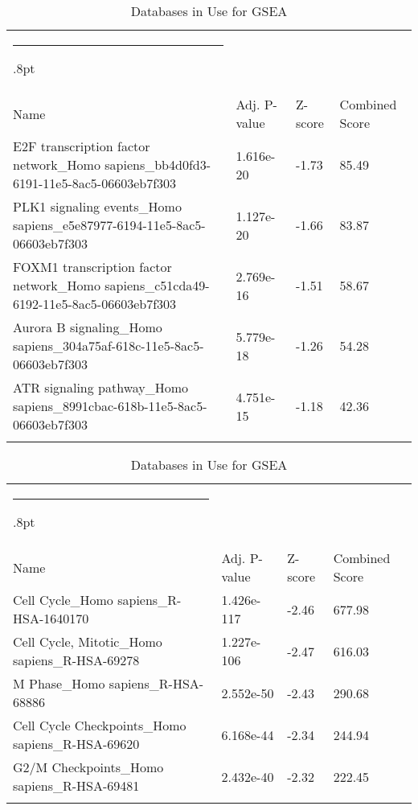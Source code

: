 \documentclass[3p,authoryear,preprint,12pt]{elsarticle}
\makeatletter
\def\hlinewd#1{%
  \noalign{\ifnum0=`}\fi\hrule \@height #1%
  \futurelet\reserved@a\@xhline}
\def\tbltoprule{\hlinewd{.8pt}\\[-12pt]}
\def\tblbottomrule{\noalign{\vspace*{6pt}}\hline\noalign{\vspace*{2pt}}}
\def\tblmidrule{\noalign{\vspace*{6pt}}\hline\noalign{\vspace*{2pt}}}
\makeatother
\begin{document}
\begin{table*}[!htbp]
	\caption{{Databases in Use for GSEA} }
	\label{tw-de478ae31cc6}
	\def\arraystretch{1}
	\ignorespaces 
	\centering 
	\begin{tabulary}{\linewidth}{p{\dimexpr.65\tabcolsep}p{\dimexpr.15\tabcolsep}p{\dimexpr.1\tabcolsep}p{\dimexpr.1\tabcolsep}}
		\tbltoprule Name & Adj. P-value & Z-score & Combined Score\\
		\tblmidrule
E2F transcription factor network\_Homo sapiens\_bb4d0fd3-6191-11e5-8ac5-06603eb7f303 & 1.616e-20 & -1.73 & 85.49 \\
PLK1 signaling events\_Homo sapiens\_e5e87977-6194-11e5-8ac5-06603eb7f303 & 1.127e-20 & -1.66 & 83.87 \\
FOXM1 transcription factor network\_Homo sapiens\_c51cda49-6192-11e5-8ac5-06603eb7f303 & 2.769e-16 & -1.51 & 58.67 \\
Aurora B signaling\_Homo sapiens\_304a75af-618c-11e5-8ac5-06603eb7f303 & 5.779e-18 & -1.26 & 54.28 \\
ATR signaling pathway\_Homo sapiens\_8991cbac-618b-11e5-8ac5-06603eb7f303 & 4.751e-15 & -1.18 & 42.36 \\
		\tblbottomrule
	\end{tabulary}\par 
\end{table*}
\begin{table*}[!htbp]
	\caption{{Databases in Use for GSEA} }
	\label{tw-de478ae31cc6}
	\def\arraystretch{1}
	\ignorespaces 
	\centering 
	\begin{tabulary}{\linewidth}{p{\dimexpr.65\tabcolsep}p{\dimexpr.15\tabcolsep}p{\dimexpr.1\tabcolsep}p{\dimexpr.1\tabcolsep}}
		\tbltoprule Name & Adj. P-value & Z-score & Combined Score\\
		\tblmidrule
Cell Cycle\_Homo sapiens\_R-HSA-1640170 & 1.426e-117 & -2.46 & 677.98 \\
Cell Cycle, Mitotic\_Homo sapiens\_R-HSA-69278 & 1.227e-106 & -2.47 & 616.03 \\
M Phase\_Homo sapiens\_R-HSA-68886 & 2.552e-50 & -2.43 & 290.68 \\
Cell Cycle Checkpoints\_Homo sapiens\_R-HSA-69620 & 6.168e-44 & -2.34 & 244.94 \\
G2/M Checkpoints\_Homo sapiens\_R-HSA-69481 & 2.432e-40 & -2.32 & 222.45 \\
		\tblbottomrule
	\end{tabulary}\par 
\end{table*}
\end{document}
